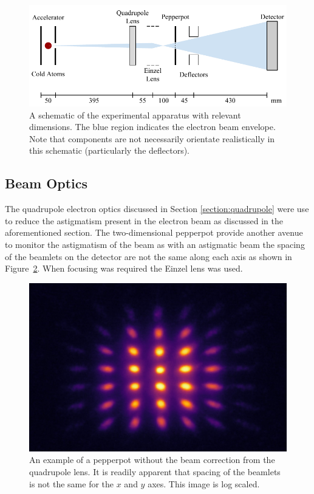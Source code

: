 \begin{figure}
\center
\includegraphics{part2/Figs/EmittanceApparatusSchematic.pdf}
\caption[Brightness measurement apparatus with dimensions.]{A schematic of the experimental apparatus with relevant dimensions. The blue region indicates the electron beam envelope. Note that components are not necessarily orientate realistically in this schematic (particularly the deflectors).}
\label{figure:emittance_schematic}
\end{figure}

\subsection{Beam Optics}
The quadrupole electron optics discussed in Section \ref{section:quadrupole} were use to reduce the astigmatism present in the electron beam as discussed in the aforementioned section.
The two-dimensional pepperpot provide another avenue to monitor the astigmatism of the beam as with an astigmatic beam the spacing of the beamlets on the detector are not the same along each axis as shown in Figure~\ref{figure:astigmatic_pepperpot}.
When focusing was required the Einzel lens was used.

\begin{figure}
    \center
    \includegraphics[width=0.5\linewidth]{part2/Figs/example_astigmatic_pepperpot.jpeg}
    \caption[Pepperpot measurements with and without beam astigmatism correction.]{An example of a pepperpot without the beam correction from the quadrupole lens. It is readily apparent that spacing of the beamlets is not the same for the $x$ and $y$ axes. This image is log scaled.}
    \label{figure:astigmatic_pepperpot}
\end{figure}

